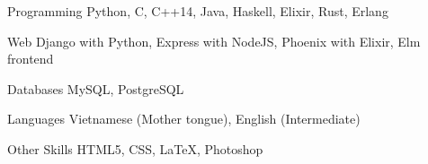 


\begin{cvskills}


\cvskill
{Programming} %
{Python, C, C++14, Java, Haskell, Elixir, Rust, Erlang} %


\cvskill
{Web} %
{Django with Python, Express with NodeJS, Phoenix with Elixir, Elm frontend} %

\cvskill
{Databases} %
{MySQL, PostgreSQL} %


\cvskill
{Languages} %
{Vietnamese (Mother tongue), English (Intermediate)} %


\cvskill
{Other Skills} %
{HTML5, CSS, LaTeX, Photoshop}%


\end{cvskills}
